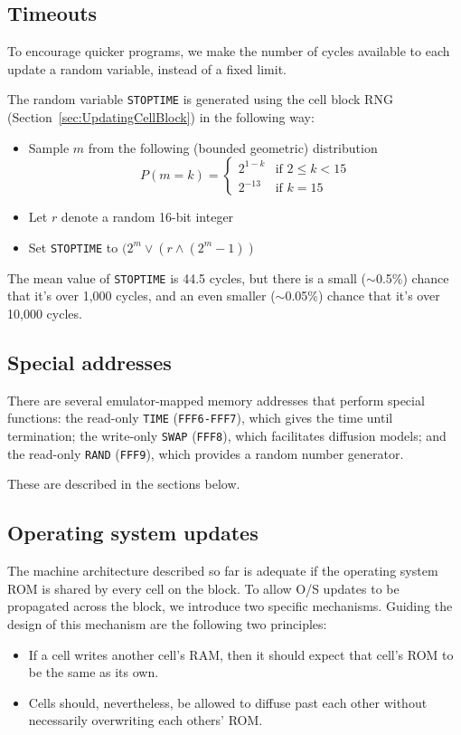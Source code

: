 \documentclass{article}
\newcommand\code[1]{{\tt #1}}
\newcommand\hex[1]{{\tt #1}}
\newcommand\hexrange[2]{\hex{#1}{\tt -}\hex{#2}}
\begin{document}
\subsection{Timeouts}
\label{sec:Timeouts}

To encourage quicker programs,
we make the number of cycles available to each update a random variable, instead of a fixed limit.

The random variable {\tt STOPTIME} is generated using the cell block RNG (Section~\ref{sec:UpdatingCellBlock})
in the following way:
\begin{itemize}
\item Sample $m$ from the following (bounded geometric) distribution
  \[
  P(m=k) = \left\{ \begin{array}{ll} 2^{1-k} & \mbox{if $2 \leq k < 15$} \\ 2^{-13} & \mbox{if $k = 15$} \end{array} \right.
    \]
  \item Let $r$ denote a random 16-bit integer
  \item Set {\tt STOPTIME} to $(2^m \vee (r \wedge (2^m - 1))$
\end{itemize}

The mean value of {\tt STOPTIME} is 44.5 cycles,
but there is a small ($\sim$0.5\%) chance that it's over 1,000 cycles,
and an even smaller ($\sim$0.05\%) chance that it's over 10,000 cycles.

\subsection{Special addresses}

There are several emulator-mapped memory addresses that perform special functions:
the read-only \code{TIME} (\hexrange{FFF6}{FFF7}), which gives the time until termination;
the write-only \code{SWAP} (\hex{FFF8}), which facilitates diffusion models;
and the read-only \code{RAND} (\hex{FFF9}), which provides a random number generator.

These are described in the sections below.

\subsection{Operating system updates}

The machine architecture described so far is adequate if the operating system ROM is shared by every cell on the block.
To allow O/S updates to be propagated across the block, we introduce two specific mechanisms.
Guiding the design of this mechanism are the following two principles:
\begin{itemize}
\item If a cell writes another cell's RAM, then it should expect that cell's ROM to be the same as its own.
\item Cells should, nevertheless, be allowed to diffuse past each other without necessarily overwriting each others' ROM.
\end{itemize}
\end{document}
